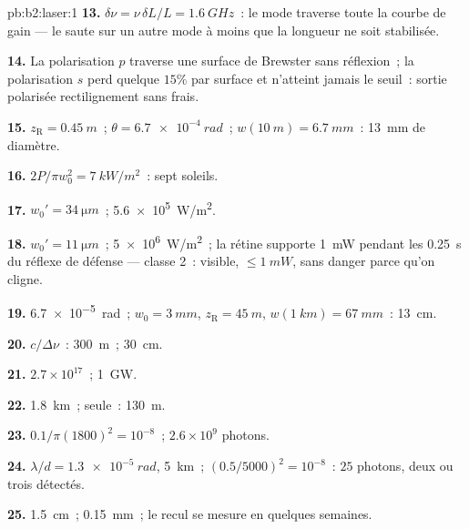 \begin{solution}{pb:b2:laser:1}
\textbf{13.} $\delta\nu = \nu\,\delta L/L = \qty{1.6}{GHz}$~: le mode traverse
toute la courbe de gain --- le  saute sur un autre mode à moins que la longueur ne soit
stabilisée.

\textbf{14.} La polarisation $p$ traverse une surface de Brewster sans
réflexion~; la polarisation $s$ perd quelque $15\%$ par surface et
n'atteint jamais le seuil~: sortie polarisée rectilignement sans frais.

\textbf{15.} $z_{\text{R}} = \qty{0.45}{m}$~; $\theta = \qty{6.7e-4}{rad}$~; $w(\qty{10}{m})
= \qty{6.7}{mm}$~: \qty{13}{mm} de diamètre.

\textbf{16.} $2P/\pi w_0^2 = \qty{7}{kW/m^2}$~: sept soleils.

\textbf{17.} $w_0' = \qty{34}{\micro m}$~; \qty{5.6e5}{W/m^2}.

\textbf{18.} $w_0' = \qty{11}{\micro m}$~; \qty{5e6}{W/m^2}~; la rétine supporte
\qty{1}{mW} pendant les \qty{0.25}{s} du réflexe de défense --- classe 2~: visible,
$\le \qty{1}{mW}$, sans danger parce qu'on cligne.

\textbf{19.} \qty{6.7e-5}{rad}~; $w_0 = \qty{3}{mm}$, $z_{\text{R}} = \qty{45}{m}$,
$w(\qty{1}{km}) = \qty{67}{mm}$~: \qty{13}{cm}.

\textbf{20.} $c/\Delta\nu$~: \qty{300}{m}~; \qty{30}{cm}.

\textbf{21.} $2.7 \times 10^{17}$~; \qty{1}{GW}.

\textbf{22.} \qty{1.8}{km}~;  seule~: \qty{130}{m}.

\textbf{23.} $0.1/\pi(1800)^2 = 10^{-8}$~; $2.6 \times 10^9$ photons.

\textbf{24.} $\lambda/d = \qty{1.3e-5}{rad}$, \qty{5}{km}~; $(0.5/5000)^2 = 10^{-8}$~:
$25$ photons, deux ou trois détectés.

\textbf{25.} \qty{1.5}{cm}~; \qty{0.15}{mm}~; le recul se mesure en quelques
semaines.
\end{solution}
